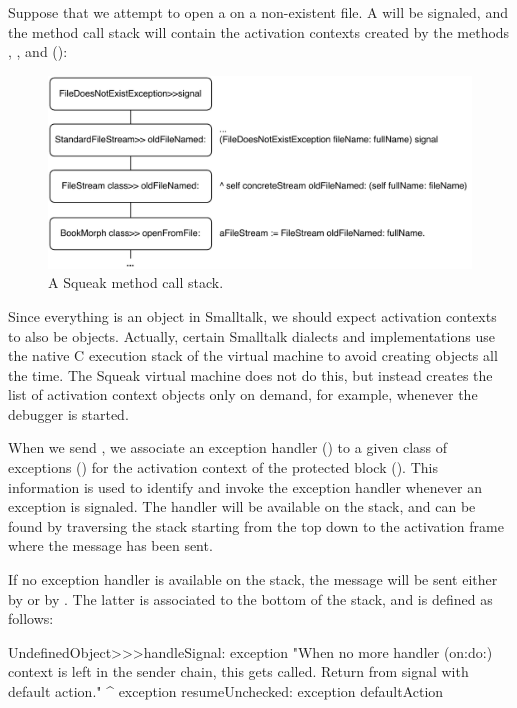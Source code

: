\documentclass[a4paper,10pt,twoside]{book}
\begin{document}
Suppose that we attempt to open a  on a non-existent file.
A  will be signaled, and the method call stack will contain the activation contexts created by the methods , , and  ():

\begin{figure}[ht]\centering
        \includegraphics[width=.9\linewidth]{Stack}
        \caption{A Squeak method call stack.}
\end{figure}

Since everything is an object in Smalltalk, we should expect activation contexts to also be objects.
Actually, certain Smalltalk dialects and implementations use the native C execution stack of the virtual machine to avoid creating objects all the time.
The Squeak virtual machine does not do this, but instead creates the list of activation context objects only on demand, for example, whenever the debugger is started.

When we send , we associate an exception handler () to a given class of exceptions () for the activation context of the protected block ().
This information is used to identify and invoke the exception handler whenever an exception is signaled. The handler will be available on the stack, and can be found by traversing the stack starting from the top down to the activation frame where the  message has been sent.

If no exception handler is available on the stack, the message  will be sent either by  or by . The latter is associated to the bottom of the stack, and is defined as follows:

\begin{code}
UndefinedObject>>>handleSignal: exception
	"When no more handler (on:do:) context is left in the sender chain, this gets called.  Return from signal with default action."
	^ exception resumeUnchecked: exception defaultAction
\end{code}
\end{document}
